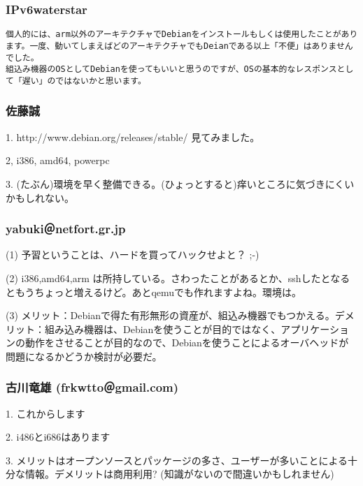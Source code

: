 \documentclass[cjk,dvipdfmx,12pt,%
hyperref={bookmarks=true,bookmarksnumbered=true,bookmarksopen=false,%
colorlinks=false,%
pdftitle={第38回関西Debian勉強会},%
pdfauthor={倉敷・のがた・佐々木},%
pdfsubject={資料},%
}]{beamer}
\begin{document}

\begin{frame}[fragile]
\frametitle{ IPv6waterstar }

\begin{verbatim}
個人的には、arm以外のアーキテクチャでDebianをインストールもしくは使用したことがあります。一度、動いてしまえばどのアーキテクチャでもDeianである以上「不便」はありませんでした。
組込み機器のOSとしてDebianを使ってもいいと思うのですが、OSの基本的なレスポンスとして「遅い」のではないかと思います。
\end{verbatim}
\end{frame}



\begin{frame}[fragile]
\frametitle{ 佐藤誠 }


\begin{verbatimtab}
1. http://www.debian.org/releases/stable/
   見てみました。

2, i386, amd64, powerpc

3. (たぶん)環境を早く整備できる。(ひょっとすると)痒いところに気づきにくいかもしれない。
\end{verbatimtab}


\end{frame}



\begin{frame}[fragile]
\frametitle{ yabuki＠netfort.gr.jp }



\begin{verbatimtab}
(1) 予習ということは、ハードを買ってハックせよと？ ;-)

(2) i386,amd64,arm は所持している。さわったことがあるとか、sshしたとなるともうちょっと増えるけど。あとqemuでも作れますよね。環境は。

(3) メリット：Debianで得た有形無形の資産が、組込み機器でもつかえる。デメリット：組み込み機器は、Debianを使うことが目的ではなく、アプリケーションの動作をさせることが目的なので、Debianを使うことによるオーバヘッドが問題になるかどうか検討が必要だ。
\end{verbatimtab}


\end{frame}



\begin{frame}[fragile]
\frametitle{ 古川竜雄 (frkwtto＠gmail.com) }



\begin{verbatimtab}
1. これからします

2. i486とi686はあります

3. メリットはオープンソースとパッケージの多さ、ユーザーが多いことによる十分な情報。デメリットは商用利用? (知識がないので間違いかもしれません)
\end{verbatimtab}


\end{frame}
\end{document}
